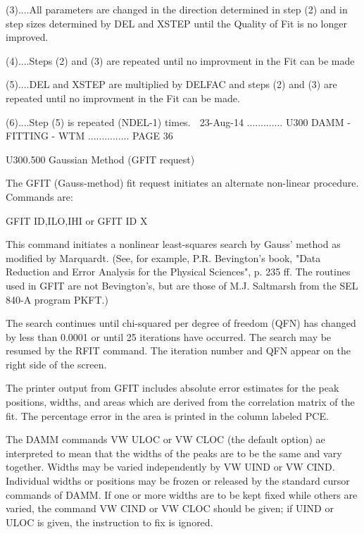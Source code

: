    (3)....All parameters are changed in the direction determined in  step  (2)
          and  in  step sizes determined by DEL and XSTEP until the Quality of
          Fit is no longer improved.
 
   (4)....Steps (2) and (3) are repeated until no improvment in  the  Fit  can
          be made
 
   (5)....DEL  and  XSTEP  are  multiplied by DELFAC and steps (2) and (3) are
          repeated until no improvment in the Fit can be made.
 
   (6)....Step (5) is repeated (NDEL-1) times.
    
   23-Aug-14 ............. U300  DAMM - FITTING - WTM ............... PAGE  36
 
   U300.500  Gaussian Method (GFIT request)
 
   The GFIT (Gauss-method)  fit  request  initiates  an  alternate  non-linear
   procedure. Commands are:
 
   GFIT ID,ILO,IHI
   or
   GFIT ID X
 
   This  command  initiates  a nonlinear least-squares search by Gauss' method
   as modified by Marquardt.  (See, for example, P.R. Bevington's  book, "Data
   Reduction  and  Error  Analysis for the Physical Sciences", p. 235 ff.  The
   routines used in GFIT are not Bevington's, but are those of M.J.  Saltmarsh
   from the SEL 840-A program PKFT.)
 
   The  search  continues  until  chi-squared  per degree of freedom (QFN) has
   changed by less than 0.0001 or until  25  iterations  have  occurred.   The
   search  may  be  resumed by the RFIT command.  The iteration number and QFN
   appear on the right side of the screen.
 
   The printer output from GFIT includes  absolute  error  estimates  for  the
   peak  positions,  widths,  and areas which are derived from the correlation
   matrix of the fit.  The percentage error in  the  area  is  printed  in the
   column labeled PCE.
 
   The  DAMM  commands  VW ULOC or VW CLOC (the default option) ae interpreted
   to mean that the widths of the peaks are to be the same and vary  together.
   Widths  may  be  varied  independently  by  VW UIND or VW CIND.  Individual
   widths or positions may be  frozen  or  released  by  the  standard  cursor
   commands  of DAMM.  If one or more widths are to be kept fixed while others
   are varied, the command VW CIND or VW CLOC should be given; if UIND or ULOC
   is given, the instruction to fix is ignored.
 
